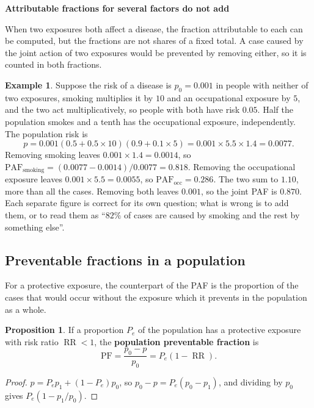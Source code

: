 \documentclass[11pt,a4paper]{article}
\numberwithin{equation}{section}
\DeclareMathOperator{\RR}{RR}
\theoremstyle{definition}
\newtheorem{exa}[thm]{Example}
\newtheorem{prop}[thm]{Proposition}
\newcommand{\subhead}[1]{%
  \par\medskip\noindent\textbf{#1}\par\nobreak\smallskip}
\begin{document}
\subhead{Attributable fractions for several factors do not add}

When two exposures both affect a disease, the fraction attributable to each can be computed, but the fractions are not shares of a
fixed total. A case caused by the joint action of two exposures would be prevented by removing either, so it is counted in both
fractions.

\begin{exa}
\label{exa:twofactors}
Suppose the risk of a disease is $p_0 = 0.001$ in people with neither of two exposures, smoking multiplies it by $10$ and an occupational
exposure by $5$, and the two act multiplicatively, so people with both have risk $0.05$. Half the population smokes and a tenth has the
occupational exposure, independently. The population risk is
\[
p = 0.001(0.5 + 0.5 \times 10)(0.9 + 0.1 \times 5) = 0.001 \times 5.5 \times 1.4 = 0.0077 .
\]
Removing smoking leaves $0.001 \times 1.4 = 0.0014$, so $\text{PAF}_{\text{smoking}} = (0.0077 - 0.0014)/0.0077 = 0.818$. Removing the occupational
exposure leaves $0.001 \times 5.5 = 0.0055$, so $\text{PAF}_{\text{occ}} = 0.286$. The two sum to $1.10$, more than all the cases. Removing both leaves
$0.001$, so the joint PAF is $0.870$. Each separate figure is correct for its own question; what is wrong is to add them, or to read them
as ``$82\%$ of cases are caused by smoking and the rest by something else''.
\end{exa}

\subsection{Preventable fractions in a population}

For a protective exposure, the counterpart of the PAF is the proportion of the cases that would occur without the exposure which it
prevents in the population as a whole.

\begin{prop}
\label{prop:pfpop}
If a proportion $P_e$ of the population has a protective exposure with risk ratio $\RR < 1$, the \textbf{population preventable fraction} is
\[
\text{PF} = \frac{p_0 - p}{p_0} = P_e(1 - \RR) .
\]
\end{prop}

\begin{proof}
$p = P_e p_1 + (1 - P_e)p_0$, so $p_0 - p = P_e(p_0 - p_1)$, and dividing by $p_0$ gives $P_e(1 - p_1/p_0)$.
\end{proof}
\end{document}
